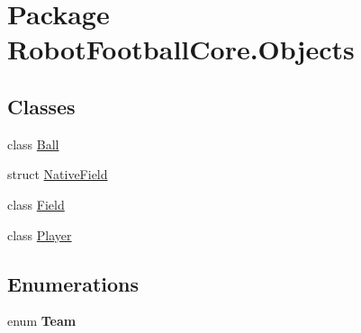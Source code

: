\hypertarget{namespace_robot_football_core_1_1_objects}{\section{Package Robot\-Football\-Core.\-Objects}
\label{namespace_robot_football_core_1_1_objects}
}
\subsection*{Classes}
\begin{DoxyCompactItemize}
\item 
class \hyperlink{class_robot_football_core_1_1_objects_1_1_ball}{Ball}
\item 
struct \hyperlink{struct_robot_football_core_1_1_objects_1_1_native_field}{Native\-Field}
\item 
class \hyperlink{class_robot_football_core_1_1_objects_1_1_field}{Field}
\item 
class \hyperlink{class_robot_football_core_1_1_objects_1_1_player}{Player}
\end{DoxyCompactItemize}
\subsection*{Enumerations}
\begin{DoxyCompactItemize}
\item 
enum {\bfseries Team} 
\end{DoxyCompactItemize}
